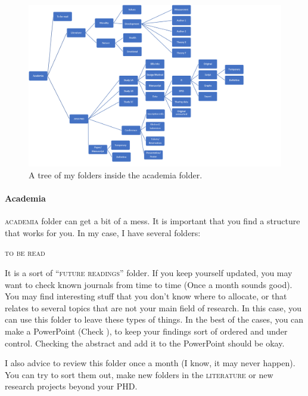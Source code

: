 \documentclass{article}
\begin{document}
\begin{landscape}
\begin{figure}
\centering
\includegraphics[height = 0.75\textwidth]{images/tree2.png}
\caption{A tree of my folders inside the academia folder.}
\label{fig: tree2}
\end{figure}
\end{landscape}


\paragraph{Academia}
\label{parag: Acad}
\textsc{academia} folder can get a bit of a mess. It is important that you find a structure that works for you. In my case, I have several folders: 
\begin{center}
    \textsc{to be read}
\end{center}
It is a sort of ``\textsc{future readings}'' folder. If you keep yourself updated, you may want to check known journals from time to time (Once a month sounds good). You may find interesting stuff that you don’t know where to allocate, or that relates to several topics that are not your main field of research. In this case, you can use this folder to leave these types of things. In the best of the cases, you can make a PowerPoint (Check ), to keep your findings sort of ordered and under control. Checking the abstract and add it to the PowerPoint should be okay. 

I also advice to review this folder once a month (I know, it may never happen). You can try to sort them out, make new folders in the \textsc{literature} or new research projects beyond your PHD.  
\end{document}
